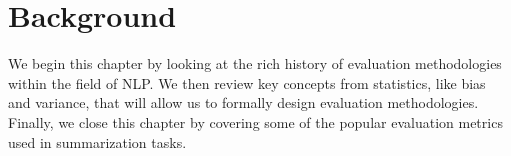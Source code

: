 
\chapter{\label{chap:setup} Background}
We begin this chapter by looking at the rich history of evaluation methodologies within the field of NLP.\@
We then review key concepts from statistics, like bias and variance, that will allow us to formally design evaluation methodologies.
Finally, we close this chapter by covering some of the popular evaluation metrics used in summarization tasks. 



